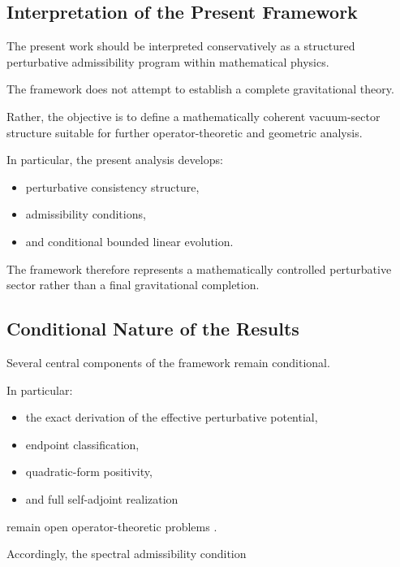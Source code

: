 
\subsection{Interpretation of the Present Framework}

The present work should be interpreted conservatively as a structured perturbative admissibility program within mathematical physics.

The framework does not attempt to establish a complete gravitational theory.

Rather, the objective is to define a mathematically coherent vacuum-sector structure suitable for further operator-theoretic and geometric analysis.

In particular, the present analysis develops:
\begin{itemize}[leftmargin=0.6cm]
\item perturbative consistency structure,
\item admissibility conditions,
\item and conditional bounded linear evolution.
\end{itemize}

The framework therefore represents a mathematically controlled perturbative sector rather than a final gravitational completion.


\subsection{Conditional Nature of the Results}

Several central components of the framework remain conditional.

In particular:
\begin{itemize}[leftmargin=0.6cm]
\item the exact derivation of the effective perturbative potential,
\item endpoint classification,
\item quadratic-form positivity,
\item and full self-adjoint realization
\end{itemize}

remain open operator-theoretic problems \cite{friedrichs1934,reedsimon2,reedsimon4,kato1995,weidmann1987}.

Accordingly, the spectral admissibility condition


